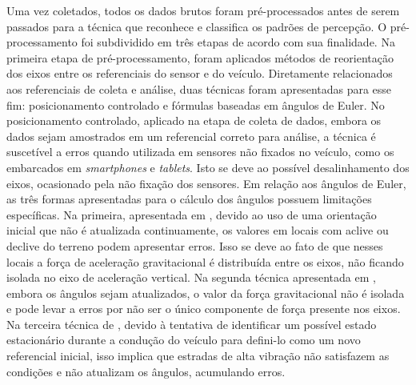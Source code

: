 Uma vez coletados, todos os dados brutos foram pré-processados antes de serem passados para a técnica que reconhece e classifica os padrões de percepção. O pré-processamento foi subdividido em três etapas de acordo com sua finalidade. Na primeira etapa de pré-processamento, foram aplicados métodos de reorientação dos eixos entre os referenciais do sensor e do veículo. Diretamente relacionados aos referenciais de coleta e análise, duas técnicas foram apresentadas para esse fim: posicionamento controlado e fórmulas baseadas em ângulos de Euler. No posicionamento controlado, aplicado na etapa de coleta de dados, embora os dados sejam amostrados em um referencial correto para análise, a técnica é suscetível a erros quando utilizada em sensores não fixados no veículo, como os embarcados em \textit{smartphones} e \textit{tablets}. Isto se deve ao possível desalinhamento dos eixos, ocasionado pela não fixação dos sensores. Em relação aos ângulos de Euler, as três formas apresentadas para o cálculo dos ângulos possuem limitações específicas. Na primeira, apresentada em \cite{Orhan2013,Vittorio2014,Singh2017}, devido ao uso de uma orientação inicial que não é atualizada continuamente, os valores em locais com aclive ou declive do terreno podem apresentar erros. Isso se deve ao fato de que nesses locais a força de aceleração gravitacional é distribuída entre os eixos, não ficando isolada no eixo de aceleração vertical. Na segunda técnica apresentada em \cite{Li2018}, embora os ângulos sejam atualizados, o valor da força gravitacional não é isolada e pode levar a erros por não ser o único componente de força presente nos eixos. Na terceira técnica de \cite{Singh2018}, devido à tentativa de identificar um possível estado estacionário durante a condução do veículo para defini-lo como um novo referencial inicial, isso implica que estradas de alta vibração não satisfazem as condições e não atualizam os ângulos, acumulando erros.

